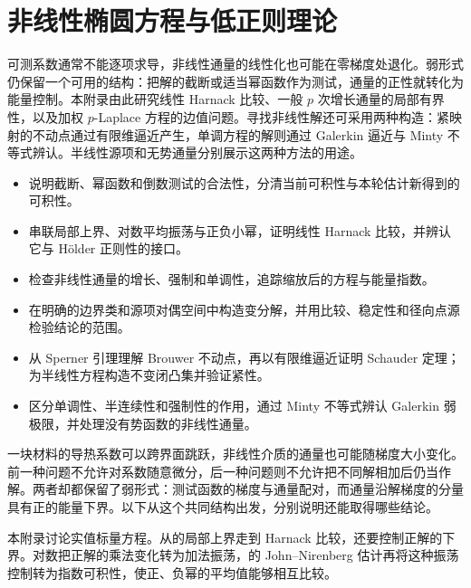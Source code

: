 \chapter{非线性椭圆方程与低正则理论}
\label{b2:app:H}

\begin{chapterabstract}
可测系数通常不能逐项求导，非线性通量的线性化也可能在零梯度处退化。弱形式仍保留一个可用的结构：把解的截断或适当幂函数作为测试，通量的正性就转化为能量控制。本附录由此研究线性 Harnack 比较、一般 \(p\) 次增长通量的局部有界性，以及加权 \(p\)-Laplace 方程的边值问题。寻找非线性解还可采用两种构造：紧映射的不动点通过有限维逼近产生，单调方程的解则通过 Galerkin 逼近与 Minty 不等式辨认。半线性源项和无势通量分别展示这两种方法的用途。
\end{chapterabstract}

\begin{learninggoals}
\begin{itemize}
\item\label{b2:item:H2-goal-test}说明截断、幂函数和倒数测试的合法性，分清当前可积性与本轮估计新得到的可积性。
\item\label{b2:item:H2-goal-iteration}串联局部上界、对数平均振荡与正负小幂，证明线性 Harnack 比较，并辨认它与 Hölder 正则性的接口。
\item\label{b2:item:H2-goal-p}检查非线性通量的增长、强制和单调性，追踪缩放后的方程与能量指数。
\item\label{b2:item:H2-goal-variation}在明确的边界类和源项对偶空间中构造变分解，并用比较、稳定性和径向点源检验结论的范围。
\item\label{b2:item:H2-goal-fixedpoint}从 Sperner 引理理解 Brouwer 不动点，再以有限维逼近证明 Schauder 定理；为半线性方程构造不变闭凸集并验证紧性。
\item\label{b2:item:H2-goal-monotone}区分单调性、半连续性和强制性的作用，通过 Minty 不等式辨认 Galerkin 弱极限，并处理没有势函数的非线性通量。
\end{itemize}
\end{learninggoals}

一块材料的导热系数可以跨界面跳跃，非线性介质的通量也可能随梯度大小变化。前一种问题不允许对系数随意微分，后一种问题则不允许把不同解相加后仍当作解。两者却都保留了弱形式：测试函数的梯度与通量配对，而通量沿解梯度的分量具有正的能量下界。以下从这个共同结构出发，分别说明还能取得哪些结论。

\ProseParagraphBreak
本附录讨论实值标量方程。从的局部上界走到 Harnack 比较，还要控制正解的下界。对数把正解的乘法变化转为加法振荡，的 John--Nirenberg 估计再将这种振荡控制转为指数可积性，使正、负幂的平均值能够相互比较。

